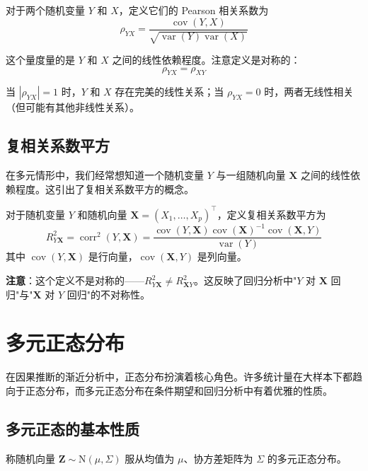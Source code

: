 \begin{Definition}\label{def:pearson-correlation}
对于两个随机变量 $Y$ 和 $X$，定义它们的 Pearson 相关系数为
\[
\rho_{YX} = \frac{\operatorname{cov}(Y, X)}{\sqrt{\operatorname{var}(Y)\operatorname{var}(X)}}
\]
\end{Definition}

这个量度量的是 $Y$ 和 $X$ 之间的线性依赖程度。注意定义是对称的：
\[
\rho_{YX} = \rho_{XY}
\]

当 $|\rho_{YX}| = 1$ 时，$Y$ 和 $X$ 存在完美的线性关系；当 $\rho_{YX} = 0$ 时，两者无线性相关（但可能有其他非线性关系）。

\subsection{复相关系数平方}

在多元情形中，我们经常想知道一个随机变量 $Y$ 与一组随机向量 $\mathbf{X}$ 之间的线性依赖程度。这引出了复相关系数平方的概念。

\begin{Definition}[复相关系数平方]\label{def:multiple-correlation}
对于随机变量 $Y$ 和随机向量 $\mathbf{X} = (X_1, \ldots, X_p)^\top$，定义复相关系数平方为
\[
R_{Y\mathbf{X}}^2 = \operatorname{corr}^2(Y, \mathbf{X}) = \frac{\operatorname{cov}(Y, \mathbf{X}) \operatorname{cov}(\mathbf{X})^{-1} \operatorname{cov}(\mathbf{X}, Y)}{\operatorname{var}(Y)}
\]
其中 $\operatorname{cov}(Y, \mathbf{X})$ 是行向量，$\operatorname{cov}(\mathbf{X}, Y)$ 是列向量。
\end{Definition}

\textbf{注意}：这个定义不是对称的——$R_{Y\mathbf{X}}^2 \neq R_{\mathbf{X}Y}^2$。这反映了回归分析中"$Y$ 对 $\mathbf{X}$ 回归"与"$\mathbf{X}$ 对 $Y$ 回归"的不对称性。

\section{多元正态分布}\label{sec:multivariate-normal}

在因果推断的渐近分析中，正态分布扮演着核心角色。许多统计量在大样本下都趋向于正态分布，而多元正态分布在条件期望和回归分析中有着优雅的性质。

\subsection{多元正态的基本性质}

\begin{Definition}[多元正态分布]\label{def:multivariate-normal}
称随机向量 $\mathbf{Z} \sim \mathrm{N}(\mu, \Sigma)$ 服从均值为 $\mu$、协方差矩阵为 $\Sigma$ 的多元正态分布。
\end{Definition}

